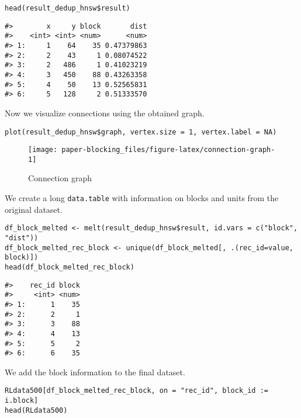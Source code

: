 \begin{verbatim}
head(result_dedup_hnsw$result)
\end{verbatim}

\begin{verbatim}
#>        x     y block       dist
#>    <int> <int> <num>      <num>
#> 1:     1    64    35 0.47379863
#> 2:     2    43     1 0.08074522
#> 3:     2   486     1 0.41023219
#> 4:     3   450    88 0.43263358
#> 5:     4    50    13 0.52565831
#> 6:     5   128     2 0.51333570
\end{verbatim}

Now we visualize connections using the obtained graph.

\begin{verbatim}
plot(result_dedup_hnsw$graph, vertex.size = 1, vertex.label = NA)
\end{verbatim}

\begin{figure}[H]

{\centering \texttt{[image: paper-blocking\_files/figure-latex/connection-graph-1]} 

}

\caption{Connection graph}\label{fig:connection-graph}
\end{figure}

We create a long \texttt{data.table} with information on blocks and units from
the original dataset.

\begin{verbatim}
df_block_melted <- melt(result_dedup_hnsw$result, id.vars = c("block", "dist"))
df_block_melted_rec_block <- unique(df_block_melted[, .(rec_id=value, block)])
head(df_block_melted_rec_block)
\end{verbatim}

\begin{verbatim}
#>    rec_id block
#>     <int> <num>
#> 1:      1    35
#> 2:      2     1
#> 3:      3    88
#> 4:      4    13
#> 5:      5     2
#> 6:      6    35
\end{verbatim}

We add the block information to the final dataset.

\begin{verbatim}
RLdata500[df_block_melted_rec_block, on = "rec_id", block_id := i.block]
head(RLdata500)
\end{verbatim}

